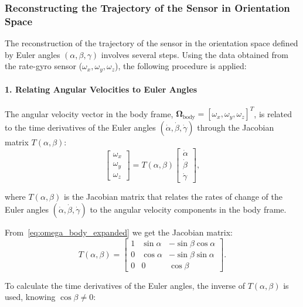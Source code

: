 \documentclass[12pt]{article}
\begin{document}
\subsubsection{Reconstructing the Trajectory of the Sensor in Orientation Space}

The reconstruction of the trajectory of the sensor in the orientation space defined by Euler angles \((\alpha, \beta, \gamma)\) involves several steps. Using the data obtained from the rate-gyro sensor (\(\omega_x, \omega_y, \omega_z\)), the following procedure is applied:

\paragraph{1. Relating Angular Velocities to Euler Angles}

The angular velocity vector in the body frame, \(\boldsymbol{\Omega}_{\text{body}} = [\omega_x, \omega_y, \omega_z]^T\), is related to the time derivatives of the Euler angles \((\dot{\alpha}, \dot{\beta}, \dot{\gamma})\) through the Jacobian matrix \(T(\alpha, \beta)\):
\begin{equation}
\label{eq:jacobian_definition}
\begin{bmatrix}
\omega_x \\
\omega_y \\
\omega_z
\end{bmatrix}
=
T(\alpha, \beta)
\begin{bmatrix}
\dot{\alpha} \\
\dot{\beta} \\
\dot{\gamma}
\end{bmatrix},
\end{equation}

where \(T(\alpha, \beta)\) is the Jacobian matrix that relates the rates of change of the Euler angles \((\dot{\alpha}, \dot{\beta}, \dot{\gamma})\) to the angular velocity components in the body frame.

From~\ref{eq:omega_body_expanded} we get the Jacobian matrix:
\begin{equation}
\label{eq:jacobian_matrix}
T(\alpha, \beta) =
\begin{bmatrix}
1 & \sin\alpha & -\sin\beta \cos\alpha \\
0 & \cos\alpha & -\sin\beta \sin\alpha \\
0 & 0 & \cos\beta
\end{bmatrix}.
\end{equation}

To calculate the time derivatives of the Euler angles, the inverse of \(T(\alpha, \beta)\) is used, knowing \(\cos\beta \neq 0\):
\end{document}
